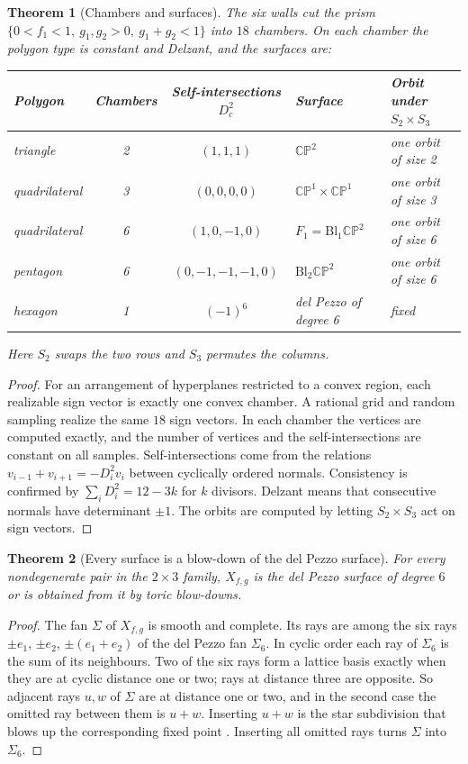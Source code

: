 \documentclass[11pt]{article}
\newtheorem{theorem}{Theorem}[section]
\theoremstyle{definition}
\theoremstyle{remark}
\newcommand{\CP}{\mathbb{CP}}
\begin{document}
\begin{theorem}[Chambers and surfaces]\label{thm:chambers}
The six walls cut the prism $\{0<f_1<1,\ g_1,g_2>0,\ g_1+g_2<1\}$ into $18$ chambers. On each chamber
the polygon type is constant and Delzant, and the surfaces are:
\begin{center}\small
\begin{tabular}{@{}lccll@{}}
\toprule
Polygon & Chambers & Self-intersections $D_c^2$ & Surface & Orbit under $S_2\times S_3$\\
\midrule
triangle & 2 & $(1,1,1)$ & $\CP^2$ & one orbit of size 2\\
quadrilateral & 3 & $(0,0,0,0)$ & $\CP^1\times\CP^1$ & one orbit of size 3\\
quadrilateral & 6 & $(1,0,-1,0)$ & $F_1=\mathrm{Bl}_1\CP^2$ & one orbit of size 6\\
pentagon & 6 & $(0,-1,-1,-1,0)$ & $\mathrm{Bl}_2\CP^2$ & one orbit of size 6\\
hexagon & 1 & $(-1)^6$ & del Pezzo of degree 6 & fixed\\
\bottomrule
\end{tabular}
\end{center}
Here $S_2$ swaps the two rows and $S_3$ permutes the columns.
\end{theorem}
\begin{proof}
For an arrangement of hyperplanes restricted to a convex region, each realizable sign vector is exactly
one convex chamber. A rational grid and random sampling realize the same $18$ sign vectors. In each
chamber the vertices are computed exactly, and the number of vertices and the self-intersections are
constant on all samples. Self-intersections come from the relations $v_{i-1}+v_{i+1}=-D_i^2v_i$
between cyclically ordered normals. Consistency is confirmed by $\sum_iD_i^2=12-3k$ for $k$ divisors.
Delzant means that consecutive normals have determinant $\pm1$. The orbits are computed by letting
$S_2\times S_3$ act on sign vectors.
\end{proof}

\begin{theorem}[Every surface is a blow-down of the del Pezzo surface]\label{thm:blowdown}
For every nondegenerate pair in the $2\times3$ family, $X_{f,g}$ is the del Pezzo surface of degree $6$ or
is obtained from it by toric blow-downs.
\end{theorem}
\begin{proof}
The fan $\Sigma$ of $X_{f,g}$ is smooth and complete. Its rays are among the six rays
$\pm e_1$, $\pm e_2$, $\pm(e_1+e_2)$ of the del Pezzo fan $\Sigma_6$. In cyclic order each ray of $\Sigma_6$ is the
sum of its neighbours. Two of the six rays form a lattice basis exactly when they are at
cyclic distance one or two; rays at distance three are opposite. So adjacent rays $u,w$ of $\Sigma$ are at
distance one or two, and in the second case the omitted ray between them is $u+w$. Inserting $u+w$ is
the star subdivision that blows up the corresponding fixed point \cite{Fulton1993}. Inserting all
omitted rays turns $\Sigma$ into $\Sigma_6$.
\end{proof}
\end{document}
